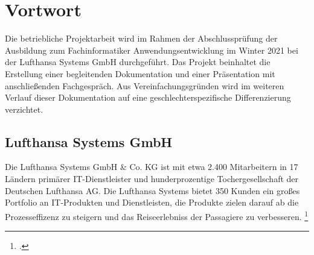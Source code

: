 \section{Vortwort}

	Die betriebliche Projektarbeit wird im Rahmen der Abschlussprüfung der Ausbildung zum
	Fachinformatiker Anwendungsentwicklung im Winter 2021 bei der Lufthansa Systems GmbH durchgeführt.
	Das Projekt beinhaltet die Erstellung einer begleitenden
	Dokumentation und einer Präsentation mit anschließenden Fachgespräch. Aus Vereinfachungsgründen wird im weiteren Verlauf dieser Dokumentation auf eine geschlechterspezifische
	Differenzierung verzichtet.


	\subsection{Lufthansa Systems GmbH}
	Die Lufthansa Systems GmbH \& Co. KG ist mit etwa 2.400 Mitarbeitern in 17 Ländern primärer IT-Dienstleister und hunderprozentige Tochergesellschaft der Deutschen Lufthansa AG.
	Die Lufthansa Systems bietet 350 Kunden ein großes Portfolio an IT-Produkten und Dienstleisten, die Produkte zielen darauf ab die Prozesseffizenz zu steigern und das Reiseerlebniss der Passagiere zu verbesseren.
	\footcite{1}

